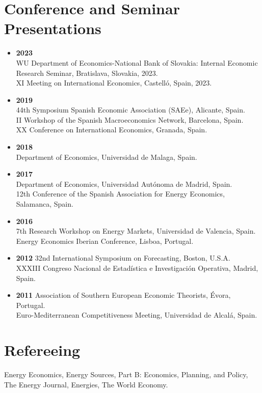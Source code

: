 \documentclass[11pt]{article}\usepackage[]{graphicx}\usepackage[usenames,dvipsnames]{xcolor}
\begin{document}
\section{Conference and Seminar Presentations} 
\begin{itemize}
  \item \textbf{2023}\\
  WU Department of Economics-National Bank of Slovakia: Internal Economic Research Seminar, Bratislava, Slovakia, 2023.\\
  XI Meeting on International Economics, Castelló, Spain, 2023.
  \item \textbf{2019}\\
  44th Symposium Spanish Economic Association (SAEe), Alicante, Spain.\\
  II Workshop of the Spanish Macroeconomics Network, Barcelona, Spain.\\
  XX Conference on International Economics, Granada, Spain.
  \item \textbf{2018}\\
  Department of Economics, Universidad de Malaga, Spain.
  \item \textbf{2017}\\
  Department of Economics, Universidad Autónoma de Madrid, Spain.\\
  12th Conference of the Spanish Association for Energy Economics, Salamanca, Spain.
  \item \textbf{2016}\\
  7th Research Workshop on Energy Markets, Universidad de Valencia, Spain.\\
  Energy Economics Iberian Conference, Lisboa, Portugal.
  \item \textbf{2012} 32nd International Symposium on Forecasting, Boston, U.S.A.\\
  XXXIII Congreso Nacional de Estadística e Investigación Operativa, Madrid, Spain.
  \item \textbf{2011} Association of Southern European Economic Theorists, Évora, Portugal.\\
  Euro-Mediterranean Competitiveness Meeting, Universidad de Alcalá, Spain.
\end{itemize}

\section{Refereeing}
\raggedright
Energy Economics, Energy Sources, Part B: Economics, Planning, and Policy, The Energy Journal, Energies, The World Economy.\\
\end{document}

